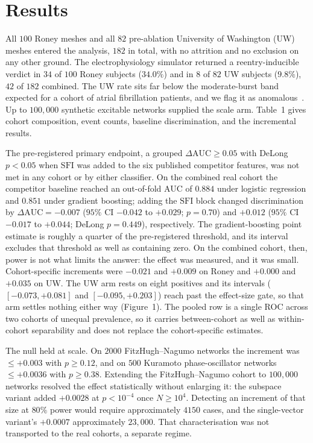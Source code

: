 \documentclass[11pt]{article}
\newcommand{\SFI}{\ensuremath{\mathrm{SFI}}}
\newcommand{\dAUC}{\ensuremath{\Delta\mathrm{AUC}}}
\begin{document}
\section{Results}

All $100$ Roney meshes and all $82$ pre-ablation University of Washington (UW)
meshes entered the analysis, $182$ in total, with no attrition and no exclusion
on any other ground. The
electrophysiology simulator returned a reentry-inducible verdict in $34$ of
$100$ Roney subjects ($34.0\%$) and in $8$ of $82$ UW subjects ($9.8\%$), $42$
of $182$ combined. The UW rate sits far below the moderate-burst band expected
for a cohort of atrial fibrillation patients, and we flag it as anomalous~\cite{kumar2012,oral2008,marquardt2018,kawai2019,liu2020}. Up to
$100{,}000$ synthetic excitable networks supplied the scale arm. Table~1 gives
cohort composition, event counts, baseline discrimination, and the incremental
results.

The pre-registered primary endpoint, a grouped $\dAUC\geq0.05$ with DeLong
$p<0.05$ when \SFI{} was added to the six published competitor features, was
not met in any cohort or by either classifier. On the combined real
cohort the competitor baseline reached an out-of-fold AUC of $0.884$ under
logistic regression and $0.851$ under gradient boosting; adding the \SFI{} block
changed discrimination by $\dAUC=-0.007$ ($95\%$ CI $-0.042$ to $+0.029$;
$p=0.70$) and $+0.012$ ($95\%$ CI $-0.017$ to $+0.044$; DeLong $p=0.449$),
respectively. The gradient-boosting point estimate is roughly a quarter of the
pre-registered threshold, and its interval excludes that threshold as well as
containing zero. On the combined cohort, then, power is not what limits the
answer: the effect was measured, and it was small. Cohort-specific increments
were $-0.021$ and $+0.009$ on Roney and $+0.000$ and $+0.035$ on UW. The UW arm
rests on eight positives and its intervals ($[-0.073,+0.081]$ and
$[-0.095,+0.203]$) reach past the effect-size gate, so that arm settles nothing
either way (Figure~1). The pooled row is a single ROC across two cohorts of
unequal prevalence, so it carries between-cohort as well as within-cohort
separability and does not replace the cohort-specific estimates.

The null held at scale. On $2000$ FitzHugh--Nagumo networks the increment was
$\leq+0.003$ with $p\geq0.12$, and on $500$ Kuramoto phase-oscillator networks
$\leq+0.0036$ with $p\geq0.38$. Extending the FitzHugh--Nagumo cohort to
$100{,}000$ networks resolved the effect statistically without enlarging it: the
subspace variant added $+0.0028$ at $p<10^{-4}$ once $N\geq10^{4}$. Detecting an
increment of that size at $80\%$ power would require approximately $4150$
cases, and the single-vector variant's $+0.0007$ approximately $23{,}000$. That
characterisation was not transported to the real cohorts, a separate regime.
\end{document}
